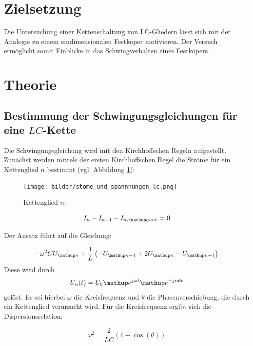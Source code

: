 \setcounter{page}{1}
\section*{Zielsetzung}
Die Untersuchung einer Kettenschaltung von LC-Gliedern lässt sich mit der Analogie
zu einem eindimensionalen Festköper motivieren.
Der Versuch ermöglicht somit Einblicke in das Schwingverhalten eines
Festköpers. %

\section{Theorie}

\subsection{Bestimmung der Schwingungsgleichungen für eine $LC$-Kette} %
Die Schwingungsgleichung wird mit den Kirchhoffschen Regeln aufgestellt. %
Zunächst werden mittels der ersten Kirchhoffschen Regel die Ströme für ein Kettenglied $n$ %
bestimmt (vgl. Abbildung \ref{fig:kettenglied}):

\begin{figure}
  \centering
  \texttt{[image: bilder/stöme\_und\_spannnungen\_lc.png]}
  \caption{Kettenglied $n$.\cite{anleitung356}} %
  \label{fig:kettenglied}
\end{figure}

\begin{equation}
\label{eq:kircheins_lc}
I_n-I_{n+1}-I_{n,\map{quer}}=0
\end{equation}

Der Ansatz führt auf die Gleichung:

\begin{equation}
\label{eq:gleichung_lc}
-\omega^2CU\ua{n}+\frac{1}{L}\left(-U\ua{n-1}+2U\ua{n}-U\ua{n+1}\right)
\end{equation}
Diese wird durch
\begin{equation}
\label{eq:loesung_gleichung_lc}
U_n(t)=U_0 \map{e}^{j\omega t} \map{e}^{-jn\theta t}
\end{equation}
gelöst.
Es sei hierbei $\omega$ die Kreisfrequenz und $\theta$ die Phasenverschiebung, %
die durch ein Kettenglied verursacht wird.
Für die Kreisfrequenz ergibt sich die Dispersionsrelation:

\begin{equation}
\label{eq:kreisfrequenz_lc_glied}
\omega^2=\frac{2}{LC}\left(1-\cos(\theta)\right)
\end{equation}

